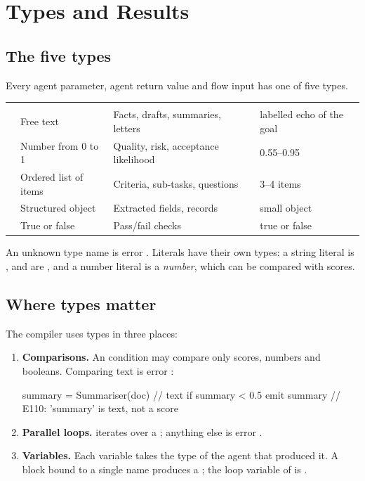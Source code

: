 \chapter{Types and Results}
\label{ch:types}

\section{The five types}

Every agent parameter, agent return value and flow input has one of five types.

\begin{center}
\small
\begin{tabularx}{\linewidth}{@{}L{1.6cm}L{4.4cm}YL{2.4cm}@{}}
\toprule
{} &  &  & \\
\goldrule
{} & Free text & Facts, drafts, summaries, letters & labelled echo of the goal\\
 & Number from 0 to 1 & Quality, risk, acceptance likelihood & 0.55--0.95\\
 & Ordered list of items & Criteria, sub-tasks, questions & 3--4 items\\
 & Structured object & Extracted fields, records & small object\\
 & True or false & Pass/fail checks & true or false\\
\bottomrule
\end{tabularx}
\end{center}

An unknown type name is error . Literals have their own types: a string literal is ,  and  are , and a number literal is a \emph{number}, which can be compared with scores.

\section{Where types matter}

The compiler uses types in three places:

\begin{enumerate}
  \item \textbf{Comparisons.} An  condition may compare only scores, numbers and booleans. Comparing text is error :
\begin{algo}
summary = Summariser(doc)          // text
if summary < 0.5 { emit summary }  // E110: 'summary' is text, not a score
\end{algo}
  \item \textbf{Parallel loops.}  iterates over a ; anything else is error .
  \item \textbf{Variables.} Each variable takes the type of the agent that produced it. A  block bound to a single name produces a ; the loop variable of  is .
\end{enumerate}

